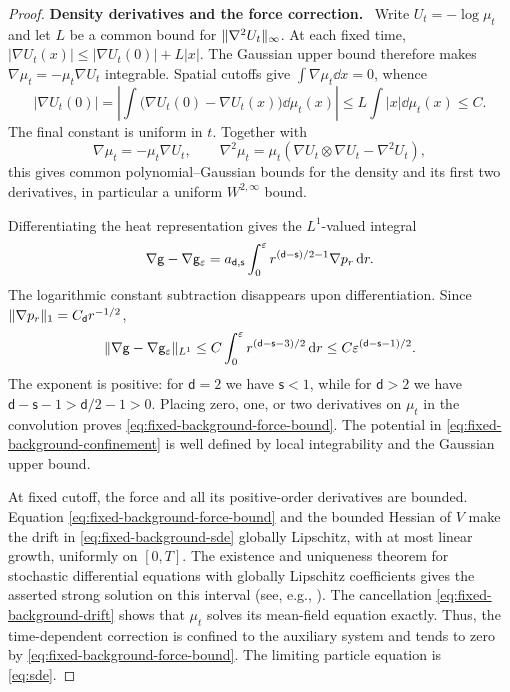 \documentclass[11pt,reqno]{amsart}
\numberwithin{equation}{section}
\theoremstyle{plain}
\theoremstyle{remark}
\DeclarePairedDelimiter{\norm}{\lVert}{\rVert}
\renewcommand{\d}{\mathsf{d}}\newcommand{\s}{\mathsf{s}}
\newcommand{\parheading}[1]{\par\medskip\noindent\textbf{#1}\ }
\begin{document}
\begin{proof}
\parheading{Density derivatives and the force correction.}
Write $U_t=-\log\mu_t$ and let $L$ be a common bound for $\norm{\nabla^2U_t}_\infty$. At each fixed time, $|\nabla U_t(x)|\le|\nabla U_t(0)|+L|x|$. The Gaussian upper bound therefore makes $\nabla\mu_t=-\mu_t\nabla U_t$ integrable. Spatial cutoffs give $\int\nabla\mu_t\dd x=0$, whence
\begin{equation}\label{eq:fixed-background-score-origin}
 |\nabla U_t(0)|=
 \left|\int\bigl(\nabla U_t(0)-\nabla U_t(x)\bigr)\dd\mu_t(x)\right|
 \le L\int|x|\dd\mu_t(x)\le C.
\end{equation}
The final constant is uniform in $t$. Together with
\begin{equation}\label{eq:fixed-background-density-derivatives}
 \nabla\mu_t=-\mu_t\nabla U_t,
 \qquad \nabla^2\mu_t=\mu_t(\nabla U_t\otimes\nabla U_t-\nabla^2U_t),
\end{equation}
this gives common polynomial--Gaussian bounds for the density and its first two derivatives, in particular a uniform $W^{2,\infty}$ bound.

Differentiating the heat representation gives the $L^1$-valued integral
\begin{equation}\label{eq:fixed-background-force-difference}
 \nabla\g-\nabla\g_\varepsilon
 =a_{\d,\s}\int_0^\varepsilon r^{(\d-\s)/2-1}\nabla p_r\dd r.
\end{equation}
The logarithmic constant subtraction disappears upon differentiation. Since $\norm{\nabla p_r}_1=C_\d r^{-1/2}$,
\begin{equation}\label{eq:fixed-background-force-L1}
 \norm{\nabla\g-\nabla\g_\varepsilon}_{L^1}
 \le C\int_0^\varepsilon r^{(\d-\s-3)/2}\dd r
 \le C\varepsilon^{(\d-\s-1)/2}.
\end{equation}
The exponent is positive: for $\d=2$ we have $\s<1$, while for $\d>2$ we have $\d-\s-1>\d/2-1>0$. Placing zero, one, or two derivatives on $\mu_t$ in the convolution proves \eqref{eq:fixed-background-force-bound}. The potential in \eqref{eq:fixed-background-confinement} is well defined by local integrability and the Gaussian upper bound.

At fixed cutoff, the force and all its positive-order derivatives are bounded. Equation \eqref{eq:fixed-background-force-bound} and the bounded Hessian of $V$ make the drift in \eqref{eq:fixed-background-sde} globally Lipschitz, with at most linear growth, uniformly on $[0,T]$. The existence and uniqueness theorem for stochastic differential equations with globally Lipschitz coefficients gives the asserted strong solution on this interval (see, e.g., \cite[Section~5.2]{Oksendal}). The cancellation \eqref{eq:fixed-background-drift} shows that $\mu_t$ solves its mean-field equation exactly. Thus, the time-dependent correction is confined to the auxiliary system and tends to zero by \eqref{eq:fixed-background-force-bound}. The limiting particle equation is \eqref{eq:sde}.


\end{proof}
\end{document}

